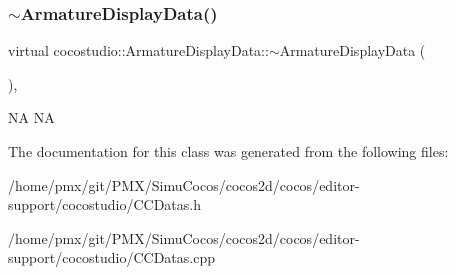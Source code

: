 \subsubsection{\texorpdfstring{$\sim$\+Armature\+Display\+Data()}{~ArmatureDisplayData()}\hspace{0.1cm}{\footnotesize\ttfamily [2/2]}}
{\footnotesize\ttfamily virtual cocostudio\+::\+Armature\+Display\+Data\+::$\sim$\+Armature\+Display\+Data (\begin{DoxyParamCaption}{ }\end{DoxyParamCaption})\hspace{0.3cm}{\ttfamily [inline]}, {\ttfamily [virtual]}}

NA  NA 

The documentation for this class was generated from the following files\+:\begin{DoxyCompactItemize}
\item 
/home/pmx/git/\+P\+M\+X/\+Simu\+Cocos/cocos2d/cocos/editor-\/support/cocostudio/C\+C\+Datas.\+h\item 
/home/pmx/git/\+P\+M\+X/\+Simu\+Cocos/cocos2d/cocos/editor-\/support/cocostudio/C\+C\+Datas.\+cpp\end{DoxyCompactItemize}
